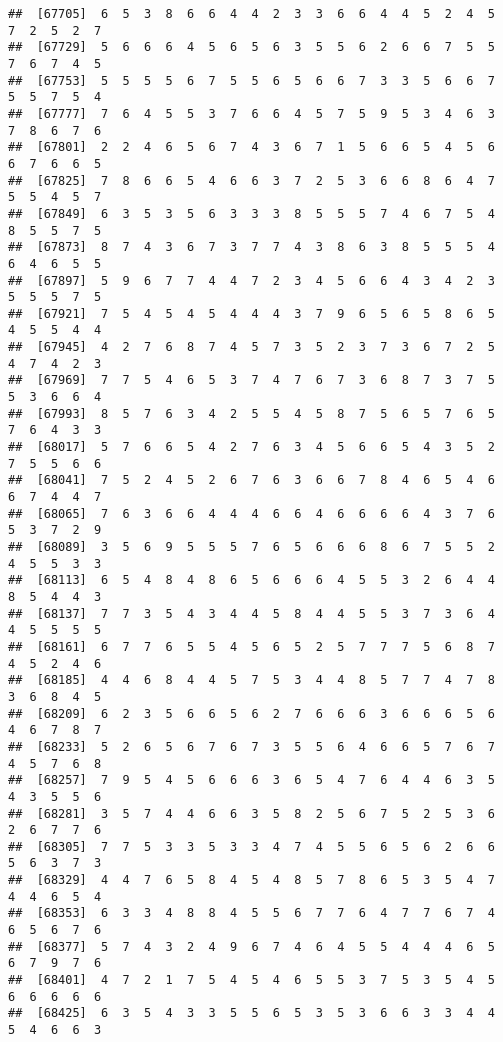 \documentclass[
]{book}
\begin{document}
\begin{verbatim}
##  [67705]  6  5  3  8  6  6  4  4  2  3  3  6  6  4  4  5  2  4  5  7  2  5  2  7
##  [67729]  5  6  6  6  4  5  6  5  6  3  5  5  6  2  6  6  7  5  5  7  6  7  4  5
##  [67753]  5  5  5  5  6  7  5  5  6  5  6  6  7  3  3  5  6  6  7  5  5  7  5  4
##  [67777]  7  6  4  5  5  3  7  6  6  4  5  7  5  9  5  3  4  6  3  7  8  6  7  6
##  [67801]  2  2  4  6  5  6  7  4  3  6  7  1  5  6  6  5  4  5  6  6  7  6  6  5
##  [67825]  7  8  6  6  5  4  6  6  3  7  2  5  3  6  6  8  6  4  7  5  5  4  5  7
##  [67849]  6  3  5  3  5  6  3  3  3  8  5  5  5  7  4  6  7  5  4  8  5  5  7  5
##  [67873]  8  7  4  3  6  7  3  7  7  4  3  8  6  3  8  5  5  5  4  6  4  6  5  5
##  [67897]  5  9  6  7  7  4  4  7  2  3  4  5  6  6  4  3  4  2  3  5  5  5  7  5
##  [67921]  7  5  4  5  4  5  4  4  4  3  7  9  6  5  6  5  8  6  5  4  5  5  4  4
##  [67945]  4  2  7  6  8  7  4  5  7  3  5  2  3  7  3  6  7  2  5  4  7  4  2  3
##  [67969]  7  7  5  4  6  5  3  7  4  7  6  7  3  6  8  7  3  7  5  5  3  6  6  4
##  [67993]  8  5  7  6  3  4  2  5  5  4  5  8  7  5  6  5  7  6  5  7  6  4  3  3
##  [68017]  5  7  6  6  5  4  2  7  6  3  4  5  6  6  5  4  3  5  2  7  5  5  6  6
##  [68041]  7  5  2  4  5  2  6  7  6  3  6  6  7  8  4  6  5  4  6  6  7  4  4  7
##  [68065]  7  6  3  6  6  4  4  4  6  6  4  6  6  6  6  4  3  7  6  5  3  7  2  9
##  [68089]  3  5  6  9  5  5  5  7  6  5  6  6  6  8  6  7  5  5  2  4  5  5  3  3
##  [68113]  6  5  4  8  4  8  6  5  6  6  6  4  5  5  3  2  6  4  4  8  5  4  4  3
##  [68137]  7  7  3  5  4  3  4  4  5  8  4  4  5  5  3  7  3  6  4  4  5  5  5  5
##  [68161]  6  7  7  6  5  5  4  5  6  5  2  5  7  7  7  5  6  8  7  4  5  2  4  6
##  [68185]  4  4  6  8  4  4  5  7  5  3  4  4  8  5  7  7  4  7  8  3  6  8  4  5
##  [68209]  6  2  3  5  6  6  5  6  2  7  6  6  6  3  6  6  6  5  6  4  6  7  8  7
##  [68233]  5  2  6  5  6  7  6  7  3  5  5  6  4  6  6  5  7  6  7  4  5  7  6  8
##  [68257]  7  9  5  4  5  6  6  6  3  6  5  4  7  6  4  4  6  3  5  4  3  5  5  6
##  [68281]  3  5  7  4  4  6  6  3  5  8  2  5  6  7  5  2  5  3  6  2  6  7  7  6
##  [68305]  7  7  5  3  3  5  3  3  4  7  4  5  5  6  5  6  2  6  6  5  6  3  7  3
##  [68329]  4  4  7  6  5  8  4  5  4  8  5  7  8  6  5  3  5  4  7  4  4  6  5  4
##  [68353]  6  3  3  4  8  8  4  5  5  6  7  7  6  4  7  7  6  7  4  6  5  6  7  6
##  [68377]  5  7  4  3  2  4  9  6  7  4  6  4  5  5  4  4  4  6  5  6  7  9  7  6
##  [68401]  4  7  2  1  7  5  4  5  4  6  5  5  3  7  5  3  5  4  5  6  6  6  6  6
##  [68425]  6  3  5  4  3  3  5  5  6  5  3  5  3  6  6  3  3  4  4  5  4  6  6  3

\end{verbatim}
\end{document}
